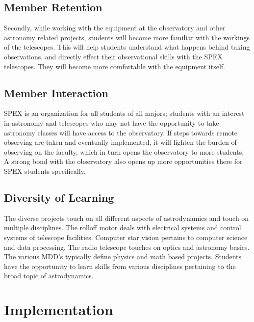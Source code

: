 \documentclass[conference]{IEEEtran} %
\begin{document}
\subsection{Member Retention}
\label{subsec:traceability}
Secondly, while working with the equipment at the observatory and other astronomy related projects, students will become more familiar with the workings of the telescopes. This will help students understand what happens behind taking observations, and directly effect their observational skills with the SPEX telescopes. They will become more comfortable with the equipment itself.
\subsection{Member Interaction}
\label{subsec:plug-n-play}
SPEX is an organization for all students of all majors; students with an interest in astronomy and telescopes who may not have the opportunity to take astronomy classes will have access to the observatory. If steps towards remote observing are taken and eventually implemented, it will lighten the burden of observing on the faculty, which in turn opens the observatory to more students. A strong bond with the observatory also opens up more opportunities there for SPEX students specifically. 

\subsection{Diversity of Learning}
\label{subsec:diverse}

The diverse projects touch on all different aspects of astrodynamics and touch on multiple disciplines. The rolloff motor deals with electrical systems and control systems of telescope facilities. Computer star vision pertains to computer science and data processing. The radio telescope touches on optics and astronomy basics. The various MDD's typically define physics and math based projects. Students have the opportunity to learn skills from various disciplines pertaining to the broad topic of astrodynamics. 


\section{Implementation}
\label{sec:implementation}
\end{document}
